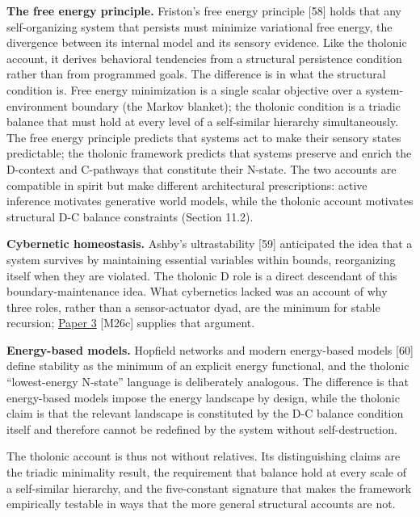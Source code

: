 \documentclass[12pt]{article}
\begin{document}
\textbf{The free energy principle.} Friston's free energy principle
{[}58{]} holds that any self-organizing system that persists must
minimize variational free energy, the divergence between its internal
model and its sensory evidence. Like the tholonic account, it derives
behavioral tendencies from a structural persistence condition rather
than from programmed goals. The difference is in what the structural
condition is. Free energy minimization is a single scalar objective over
a system-environment boundary (the Markov blanket); the tholonic
condition is a triadic balance that must hold at every level of a
self-similar hierarchy simultaneously. The free energy principle
predicts that systems act to make their sensory states predictable; the
tholonic framework predicts that systems preserve and enrich the
D-context and C-pathways that constitute their N-state. The two accounts
are compatible in spirit but make different architectural prescriptions:
active inference motivates generative world models, while the tholonic
account motivates structural D-C balance constraints (Section 11.2).

\textbf{Cybernetic homeostasis.} Ashby's ultrastability {[}59{]}
anticipated the idea that a system survives by maintaining essential
variables within bounds, reorganizing itself when they are violated. The
tholonic D role is a direct descendant of this boundary-maintenance
idea. What cybernetics lacked was an account of why three roles, rather
than a sensor-actuator dyad, are the minimum for stable recursion;
\href{https://github.com/baardev/truevalue/blob/main/docnav/Research/papers/3_minimal-recursive-triadic-framework/3_minimal-recursive-triadic-framework.pdf}{Paper
3} {[}M26c{]} supplies that argument.

\textbf{Energy-based models.} Hopfield networks and modern energy-based
models {[}60{]} define stability as the minimum of an explicit energy
functional, and the tholonic ``lowest-energy N-state'' language is
deliberately analogous. The difference is that energy-based models
impose the energy landscape by design, while the tholonic claim is that
the relevant landscape is constituted by the D-C balance condition
itself and therefore cannot be redefined by the system without
self-destruction.

The tholonic account is thus not without relatives. Its distinguishing
claims are the triadic minimality result, the requirement that balance
hold at every scale of a self-similar hierarchy, and the five-constant
signature that makes the framework empirically testable in ways that the
more general structural accounts are not.
\end{document}
